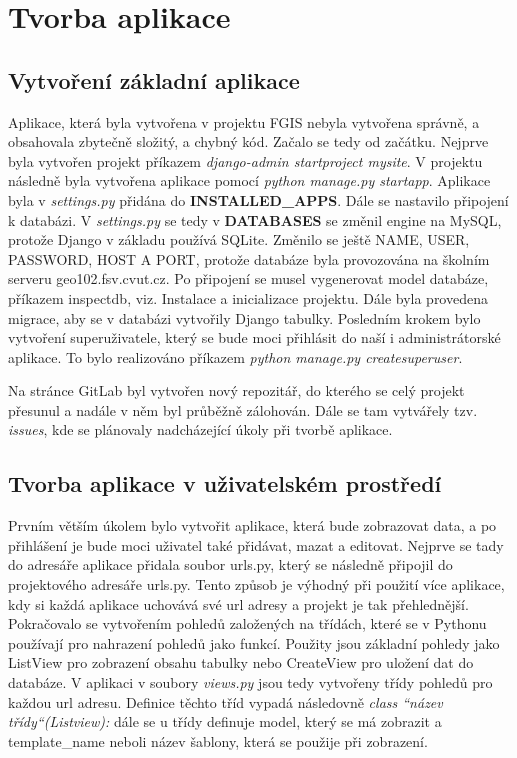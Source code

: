 \chapter{Tvorba aplikace}
\label{4-tvorba-aplikace}

\section{Vytvoření základní aplikace}

Aplikace, která byla vytvořena v projektu FGIS nebyla vytvořena správně, a obsahovala zbytečně složitý, a chybný kód. Začalo se tedy od začátku. Nejprve byla vytvořen projekt příkazem \emph{django-admin startproject mysite}. V projektu následně byla vytvořena aplikace pomocí \emph{python manage.py startapp}. Aplikace byla v \emph{settings.py} přidána do \textbf{INSTALLED\_APPS}. Dále se nastavilo připojení k databázi. V \emph{settings.py} se tedy v \textbf{DATABASES} se změnil engine na MySQL, protože Django v základu používá SQLite. Změnilo se ještě NAME, USER, PASSWORD, HOST A PORT, protože databáze byla provozována na školním serveru geo102.fsv.cvut.cz. Po připojení se musel vygenerovat model databáze, příkazem inspectdb, viz. Instalace a inicializace projektu. Dále byla provedena migrace, aby se v databázi vytvořily Django tabulky. Posledním krokem bylo vytvoření superuživatele, který se bude moci přihlásit do naší i administrátorské aplikace. To bylo realizováno příkazem \emph{python manage.py createsuperuser}.

Na stránce GitLab byl vytvořen nový repozitář, do kterého se celý projekt přesunul a nadále v něm byl průběžně zálohován. Dále se tam vytvářely tzv. \emph{issues}, kde se plánovaly nadcházející úkoly při tvorbě aplikace.

\section{Tvorba aplikace v uživatelském prostředí}

Prvním větším úkolem bylo vytvořit aplikace, která bude zobrazovat data, a po přihlášení je bude moci uživatel také přidávat, mazat a editovat. Nejprve se tady do adresáře aplikace přidala soubor urls.py, který se následně připojil do projektového adresáře urls.py. Tento způsob je výhodný při použití více aplikace, kdy si každá aplikace uchovává své url adresy a projekt je tak přehlednější. Pokračovalo se vytvořením pohledů založených na třídách, které se v Pythonu používají pro nahrazení pohledů jako funkcí. Použity jsou základní pohledy jako ListView pro zobrazení obsahu tabulky nebo CreateView pro uložení dat do databáze. V aplikaci v soubory \emph{views.py} jsou tedy vytvořeny třídy pohledů pro každou url adresu. Definice těchto tříd vypadá následovně \emph{class “název třídy“(Listview):} dále se u třídy definuje model, který se má zobrazit a template\_name neboli název šablony, která se použije při zobrazení.

